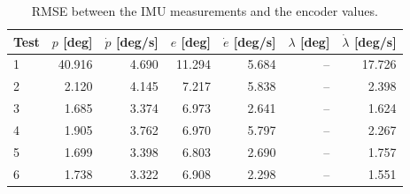 \begin{table}[htbp]
  \centering
  \caption{RMSE between the IMU measurements and the encoder values.}
  \label{tab:lab4_rmse_imu}
  \begin{tabular}{lrrrrrr}
    \toprule
    Test & $p$ [deg] & $\dot{p}$ [deg/s] & $e$ [deg] & $\dot{e}$ [deg/s] & $\lambda$ [deg] & $\dot{\lambda}$ [deg/s] \\
    \midrule
    1 & 40.916 & 4.690 & 11.294 & 5.684 & -- & 17.726 \\
    2 & 2.120 & 4.145 & 7.217 & 5.838 & -- & 2.398 \\
    3 & 1.685 & 3.374 & 6.973 & 2.641 & -- & 1.624 \\
    4 & 1.905 & 3.762 & 6.970 & 5.797 & -- & 2.267 \\
    5 & 1.699 & 3.398 & 6.803 & 2.690 & -- & 1.757 \\
    6 & 1.738 & 3.322 & 6.908 & 2.298 & -- & 1.551 \\
    \bottomrule
  \end{tabular}
\end{table}
